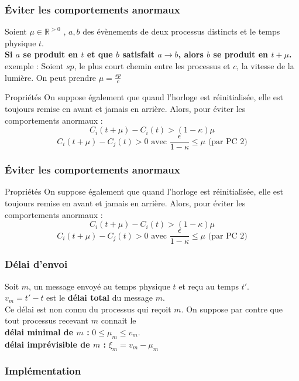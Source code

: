 \documentclass[compress]{beamer}
\begin{document}
\begin{frame}
\frametitle{\'Eviter les comportements anormaux}
Soient $\mu \in \mathbb{R}^{> 0}$ , $a, b$ des évènements de deux processus distincts et le temps physique $t$.\\
\textbf{Si $a$ se produit en $t$ et que $b$ satisfait {\color{cyan}$a \rightarrow b$}, alors $b$ se produit en {\color{cyan}$t + \mu$.}}\\
exemple : Soient $sp$, le plus court chemin entre les processus et $c$, la vitesse de la lumière. On peut prendre $\mu = \frac{sp}{c}$
\begin{block}{Propriétés}
On suppose également que quand l'horloge est réinitialisée, elle est toujours remise en avant et jamais en arrière. Alors, pour éviter les comportements anormaux :
\[ C_i(t+\mu) - C_i(t) > (1 - \kappa)\mu\]
\[ C_i(t+\mu) - C_j(t) > 0 \text{ avec } \frac{\epsilon}{1-\kappa} \leq \mu \text{ (par PC 2)} \]
\end{block}
\end{frame}

\begin{frame}
\frametitle{\'Eviter les comportements anormaux}
\begin{block}{Propriétés}
On suppose également que quand l'horloge est réinitialisée, elle est toujours remise en avant et jamais en arrière. Alors, pour éviter les comportements anormaux :
\[ C_i(t+\mu) - C_i(t) > (1 - \kappa)\mu\]
\[ C_i(t+\mu) - C_j(t) > 0 \text{ avec } \frac{\epsilon}{1-\kappa} \leq \mu \text{ (par PC 2)} \]
\end{block}
\end{frame}

\begin{frame}
\frametitle{Délai d'envoi}
Soit $m$, un message envoyé au temps physique $t$ et reçu au temps $t'$.\\
{\color{cyan}$v_m = t' - t$} est le \textbf{\color{cyan}délai total} du message $m$.\\
Ce délai est non connu du processus qui reçoit $m$. On suppose par contre que tout processus recevant $m$ connait le\\ \textbf{\color{cyan} délai minimal de $m$ : } $0 \leq \mu_m \leq v_m$. \\
\textbf{\color{cyan} délai imprévisible de $m$ : }$\xi_m = v_m - \mu_m$
\end{frame}

\begin{frame}
\frametitle{Implémentation}

\end{frame}
\end{document}
